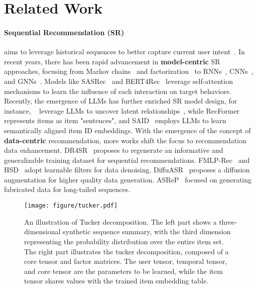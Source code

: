 \vspace{-0.5cm}

\section{Related Work} \label{sec:related_work}


\paragraph{Sequential Recommendation (SR)} aims to leverage historical sequences to better capture current user intent~\cite{quadrana2018sequence}. In recent years, there has been rapid advancement in \textbf{model-centric} SR approaches, focusing from Markov chains~\cite{he2016fusing} and factorization~\cite{rendle2010factorizing} to RNNs~\cite{GRU4Rec, narm}, CNNs~\cite{Caser, CosRec}, and GNNs~\cite{SRGNN, GCSAN, GCEGNN}. Models like SASRec~\cite{SASRec} and BERT4Rec~\cite{bert4rec} leverage self-attention mechanisms to learn the influence of each interaction on target behaviors.  Recently, the emergence of LLMs has further enriched SR model design, for instance, ~\cite{harte2023leveraging, yang2024sequential} leverage LLMs to uncover latent relationships~\cite{guo2024scaling}, while RecFormer~\cite{li2023text} represents items as item "sentences", and SAID~\cite{hu2024enhancing} employs LLMs to learn semantically aligned item ID embeddings. With the emergence of the concept of \textbf{data-centric} recommendation, more works shift the focus to recommendation data enhancement. DR4SR~\cite{yin2024dataset} proposes to regenerate an informative and generalizable training dataset for sequential recommendations. FMLP-Rec~\cite{zhou2022filter} and HSD~\cite{zhang2022hierarchical} adopt learnable filters for data denoising. DiffuASR~\cite{liu2023diffusion} proposes a diffusion augmentation for higher quality data generation. ASReP~\cite{ASReP} focused on generating fabricated data for long-tailed sequences.


\begin{figure}[t!] \centering
    \centering
    \texttt{[image: figure/tucker.pdf]}
    \vspace{-0.2cm}
    \caption{An illustration of Tucker decomposition. The left part shows a three-dimensional synthetic sequence summary, with the third dimension representing the probability distribution over the entire item set. The right part illustrates the tucker decomposition, composed of a core tensor and factor matrices. The user tensor, temporal tensor, and core tensor are the parameters to be learned, while the item tensor shares values with the trained item embedding table.}
    \label{fig:tucker}
    \vspace{-0.4cm}
\end{figure}


